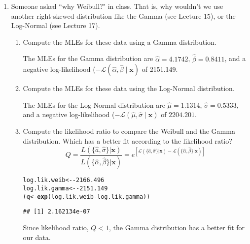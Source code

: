 \documentclass{article}\usepackage[]{graphicx}\usepackage[]{xcolor}
\makeatletter
\newcommand{\hlnum}[1]{\textcolor[rgb]{0.686,0.059,0.569}{#1}}%
\newcommand{\hlopt}[1]{\textcolor[rgb]{0,0,0}{#1}}%
\newcommand{\hldef}[1]{\textcolor[rgb]{0.345,0.345,0.345}{#1}}%
\newcommand{\hlkwb}[1]{\textcolor[rgb]{0.69,0.353,0.396}{#1}}%
\newcommand{\hlkwd}[1]{\textcolor[rgb]{0.737,0.353,0.396}{\textbf{#1}}}%
\newenvironment{kframe}{%
 \def\at@end@of@kframe{}%
 \ifinner\ifhmode%
  \def\at@end@of@kframe{\end{minipage}}%
  \begin{minipage}{\columnwidth}%
 \fi\fi%
 \def\FrameCommand##1{\hskip\@totalleftmargin \hskip-\fboxsep
 \colorbox{shadecolor}{##1}\hskip-\fboxsep
     \hskip-\linewidth \hskip-\@totalleftmargin \hskip\columnwidth}%
 \MakeFramed {\advance\hsize-\width
   \@totalleftmargin\z@ \linewidth\hsize
   \@setminipage}}%
 {\par\unskip\endMakeFramed%
 \at@end@of@kframe}
\newenvironment{knitrout}{}{} %
\makeatother
\begin{document}
\begin{enumerate}
  \item Someone asked ``why Weibull?" in class. That is, why wouldn't we use 
  another right-skewed distribution like the Gamma (see Lecture 15), or
  the Log-Normal (see Lecture 17).
  \begin{enumerate}
    \item Compute the MLEs for these data using a Gamma distribution. 
    
    The MLEs for the Gamma distribution are $\hat{\alpha} = 4.1742$, $\hat{\beta} = 0.8411$, and a negative log-likelihood ($-\mathcal{L}(\hat{\alpha}, \hat{\beta} \mid \mathbf{x})$ of 2151.149.
    
    \item Compute the MLEs for these data using the Log-Normal distribution.
    
    The MLEs for the Log-Normal distribution are $\hat{\mu} = 1.1314$, $\hat{\sigma} = 0.5333$, and a negative log-likelihood ($-\mathcal{L}(\hat{\mu}, \hat{\sigma} \mid \mathbf{x})$ of $2204.201$.
    
    \item Compute the likelihood ratio to compare the Weibull and the Gamma distribution. 
    Which has a better fit according to the likelihood ratio?
    \[Q = \frac{L(\{\hat{a}, \hat{\sigma}\}|\mathbf{x})}{L(\{\hat{\alpha}, \hat{\beta}\}|\mathbf{x})}=e^{\left[\mathcal{L}(\{\hat{a}, \hat{\sigma}\}|\mathbf{x}) - \mathcal{L}(\{\hat{\alpha}, \hat{\beta}\}|\mathbf{x})\right]}\]
\begin{knitrout}\scriptsize
{}\color{fgcolor}\begin{kframe}
\begin{alltt}
\hldef{log.lik.weib} \hlkwb{<-} \hlopt{-}\hlnum{2166.496}
\hldef{log.lik.gamma} \hlkwb{<-} \hlopt{-}\hlnum{2151.149}
\hldef{(q} \hlkwb{<-} \hlkwd{exp}\hldef{(log.lik.weib} \hlopt{-} \hldef{log.lik.gamma))}
\end{alltt}
\begin{verbatim}
## [1] 2.162134e-07
\end{verbatim}
\end{kframe}
\end{knitrout}
  Since likelihood ratio, $Q < 1$, the Gamma distribution has a better fit for our data. 
  

\end{enumerate}
\end{enumerate}
\end{document}
